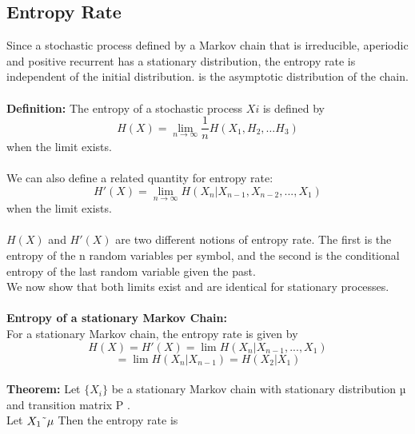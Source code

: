 \documentclass[10pt,twocolumn,letterpaper]{article}
\begin{document}
\subsection{Entropy Rate}
Since a stochastic process defined by a Markov chain that is irreducible, aperiodic and positive recurrent has a stationary distribution, the entropy rate is independent of the initial distribution. is the asymptotic distribution of the chain.\\
\\ \textbf{Definition: }The entropy of a stochastic process \begin{math} {X i } \end{math} is deﬁned by
\begin{equation*}
    H(X) = \lim_{n \to \infty} {\frac{1}{n}}H(X_1,H_2, \dots H_3)
\end{equation*} when the limit exists.\\
\\We can also deﬁne a related quantity for entropy rate:
\begin{equation*}
    H'( X ) = \lim_{n \to \infty} H (X_n |X_{n-1} , X_{n-2} , . . . , X_1 )
\end{equation*} when the limit exists.\\
\\\begin{math}
      H(X) 
\end{math} and \begin{math}
      H'(X)
\end{math} are two different notions of entropy rate. The first is the entropy of the n random variables per symbol, and the second is the conditional entropy of the last random variable given the past. \\ We now show that both limits exist and are identical for stationary processes.\\
\\ \textbf{Entropy of a stationary Markov Chain:}\\
For a stationary Markov chain, the entropy rate is given by
\begin{equation*}
    H ( X ) = H'( X ) = \lim H (X_n |X_{n-1} , . . . , X_1 ) 
\end{equation*}
\begin{equation}
= \lim H (X_n |X_{n-1} )
= H (X_2 |X_1 )
\end{equation}\\
\textbf{Theorem: }Let \begin{math}
      \{X_i\}
\end{math} be a stationary Markov chain with stationary distribution µ and transition matrix P . \\Let \begin{math}
      X_1  \char`\~ \mu
\end{math} Then the entropy rate is
\end{document}
